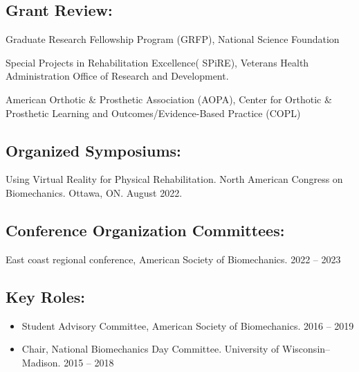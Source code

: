 \documentclass[letterpaper, 10pt]{article}
\begin{document}
\subsection{Grant Review:}
\begin{hanginglist}
    \item Graduate Research Fellowship Program (GRFP), National Science Foundation
    \item Special Projects in Rehabilitation Excellence( SPiRE), Veterans Health Administration Office of Research and Development.
    \item American Orthotic \& Prosthetic Association (AOPA), Center for Orthotic \& Prosthetic Learning and Outcomes/Evidence-Based Practice (COPL)
\end{hanginglist}

\subsection{Organized Symposiums:}
\begin{hanginglist}
     \item Using Virtual Reality for Physical Rehabilitation. North American Congress on Biomechanics. Ottawa, ON. August 2022.
\end{hanginglist}

\subsection{Conference Organization Committees:}
\begin{hanginglist}
     \item East coast regional conference, American Society of Biomechanics. \hfill 2022 -- 2023
\end{hanginglist}


\subsection{Key Roles:}
\begin{itemize}
    \item[] Student Advisory Committee, American Society of Biomechanics. \hfill 2016 -- 2019 %
    \item[] Chair, National Biomechanics Day Committee. University of Wisconsin--Madison. \hfill 2015 -- 2018
\end{itemize}
\end{document}
